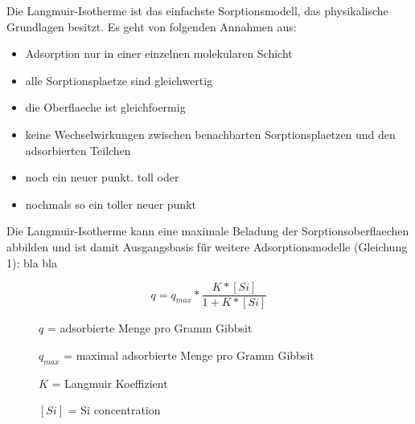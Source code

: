 Die Langmuir-Isotherme ist das einfachste Sorptionsmodell, das physikalische Grundlagen besitzt. 
Es geht von folgenden Annahmen aus:


\begin{itemize}
\item Adsorption nur in einer einzelnen molekularen Schicht
\item alle Sorptionsplaetze sind gleichwertig
\item die Oberflaeche ist gleichfoermig 
\item keine Wechselwirkungen zwischen benachbarten Sorptionsplaetzen und den adsorbierten Teilchen
\item noch ein neuer punkt. toll oder 
\item nochmals so ein toller neuer punkt
\end{itemize}


Die Langmuir-Isotherme kann eine maximale Beladung der Sorptionsoberflaechen abbilden und ist damit Ausgangsbasis für weitere Adsorptionsmodelle (Gleichung 1):
bla bla


\begin{equation}
q=q_{max}*\frac{K*[Si]}{1+K*[Si]}
\end{equation}


\begin{description}
\item[ ] $q$ = adsorbierte Menge pro Gramm Gibbsit
\item[ ] $q_{max}$ = maximal adsorbierte Menge pro Gramm Gibbsit
\item[ ]$K$ = Langmuir Koeffizient	
\item[ ]$[Si]$ = Si concentration
\end{description}
